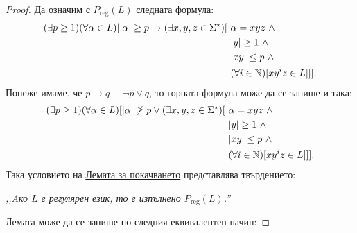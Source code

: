 \begin{proof}
  Да означим с $P_{\text{reg}}(L)$ следната формула:
  \begin{align*}
    (\exists p \geq 1)(\forall \alpha \in L)[\lvert{\alpha}\rvert \geq p \to (\exists x,y,z\in\Sigma^\star)[\ & \alpha = xyz\ \land \\
                                                                                                              & \lvert{y}\rvert \geq 1\ \land\\
                                                                                                              & \lvert{xy}\rvert \leq p\ \land\\
                                                                                                              & (\forall i\in\mathbb{N})[xy^iz \in L]]].
  \end{align*}
  Понеже имаме, че $p \to q \equiv \neg p \lor q$, то горната формула може да се запише и така:
  \begin{align*}
    (\exists p \geq 1)(\forall \alpha \in L)[ \lvert{\alpha}\rvert \not\geq p \lor (\exists x,y,z\in\Sigma^\star)[\ & \alpha = xyz\ \land \\
                                                                                                            & \lvert{y}\rvert \geq 1\ \land\\
                                                                                                            & \lvert{xy}\rvert \leq p\ \land\\
                                                                                                            & (\forall i\in\mathbb{N})[xy^iz \in L]]].
  \end{align*}  
  Така условието на \hyperref[lem:regular:pumping]{Лемата за покачването} представлява твърдението:
  \begin{center}
    {\em ,,Aко $L$ е регулярен език, то е изпълнено $P_{\text{reg}}(L)$.''}
  \end{center}
  \noindent
  Лемата може да се запише по следния еквивалентен начин:
  

\end{proof}

